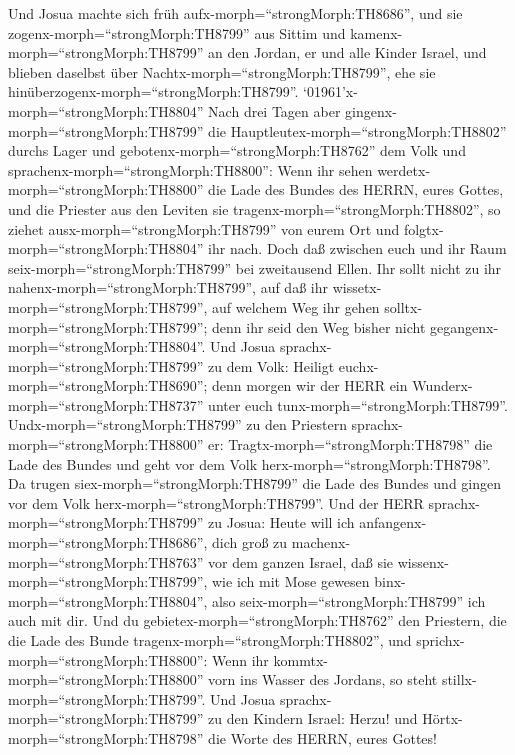  Und Josua machte sich früh
aufx-morph=``strongMorph:TH8686'', und sie
zogenx-morph=``strongMorph:TH8799'' aus Sittim und
kamenx-morph=``strongMorph:TH8799'' an den Jordan, er und alle Kinder
Israel, und blieben daselbst über Nachtx-morph=``strongMorph:TH8799'',
ehe sie hinüberzogenx-morph=``strongMorph:TH8799''. 
`01961'\textbar x-morph=``strongMorph:TH8804'' Nach drei Tagen aber
gingenx-morph=``strongMorph:TH8799'' die
Hauptleutex-morph=``strongMorph:TH8802'' durchs Lager  und
gebotenx-morph=``strongMorph:TH8762'' dem Volk und
sprachenx-morph=``strongMorph:TH8800'': Wenn ihr sehen
werdetx-morph=``strongMorph:TH8800'' die Lade des Bundes des HERRN,
eures Gottes, und die Priester aus den Leviten sie
tragenx-morph=``strongMorph:TH8802'', so ziehet
ausx-morph=``strongMorph:TH8799'' von eurem Ort und
folgtx-morph=``strongMorph:TH8804'' ihr nach.  Doch daß
zwischen euch und ihr Raum seix-morph=``strongMorph:TH8799'' bei
zweitausend Ellen. Ihr sollt nicht zu ihr
nahenx-morph=``strongMorph:TH8799'', auf daß ihr
wissetx-morph=``strongMorph:TH8799'', auf welchem Weg ihr gehen
solltx-morph=``strongMorph:TH8799''; denn ihr seid den Weg bisher nicht
gegangenx-morph=``strongMorph:TH8804''.  Und Josua
sprachx-morph=``strongMorph:TH8799'' zu dem Volk: Heiligt
euchx-morph=``strongMorph:TH8690''; denn morgen wir der HERR ein
Wunderx-morph=``strongMorph:TH8737'' unter euch
tunx-morph=``strongMorph:TH8799''. 
Undx-morph=``strongMorph:TH8799'' zu den Priestern
sprachx-morph=``strongMorph:TH8800'' er:
Tragtx-morph=``strongMorph:TH8798'' die Lade des Bundes und geht vor dem
Volk herx-morph=``strongMorph:TH8798''. Da trugen
siex-morph=``strongMorph:TH8799'' die Lade des Bundes und gingen vor dem
Volk herx-morph=``strongMorph:TH8799''.  Und der HERR
sprachx-morph=``strongMorph:TH8799'' zu Josua: Heute will ich
anfangenx-morph=``strongMorph:TH8686'', dich groß zu
machenx-morph=``strongMorph:TH8763'' vor dem ganzen Israel, daß sie
wissenx-morph=``strongMorph:TH8799'', wie ich mit Mose gewesen
binx-morph=``strongMorph:TH8804'', also
seix-morph=``strongMorph:TH8799'' ich auch mit dir.  Und du
gebietex-morph=``strongMorph:TH8762'' den Priestern, die die Lade des
Bunde tragenx-morph=``strongMorph:TH8802'', und
sprichx-morph=``strongMorph:TH8800'': Wenn ihr
kommtx-morph=``strongMorph:TH8800'' vorn ins Wasser des Jordans, so
steht stillx-morph=``strongMorph:TH8799''.  Und Josua
sprachx-morph=``strongMorph:TH8799'' zu den Kindern Israel: Herzu! und
Hörtx-morph=``strongMorph:TH8798'' die Worte des HERRN, eures Gottes!
